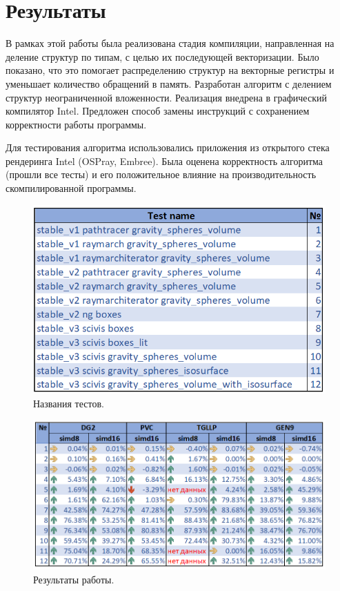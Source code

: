 \section{Результаты}
\label{sec:conclusion-future}
В рамках этой работы была реализована стадия компиляции, направленная на деление структур по типам, с целью их последующей векторизации.
Было показано, что это помогает распределению структур на векторные регистры и уменьшает количество обращений в память.
Разработан алгоритм с делением структур неограниченной вложенности.
Реализация внедрена в графический компилятор Intel.
Предложен способ замены инструкций с сохранением корректности работы программы.

Для тестирования алгоритма использовались приложения из открытого стека рендеринга Intel (OSPray, Embree).
Была оценена корректность алгоритма (прошли все тесты) и его положительное влияние на производительность скомпилированной программы.

\begin{figure}[ht]
    \centering
    \includegraphics[scale=0.55]{Images/results_name.png}
    \caption{Названия тестов.}
    \label{fig:results_name}
\end{figure}

\begin{figure}[ht]
    \centering
    \includegraphics[scale=0.54]{Images/results_pure.png}
    \caption{Результаты работы.}
    \label{fig:results_pure}
\end{figure}

